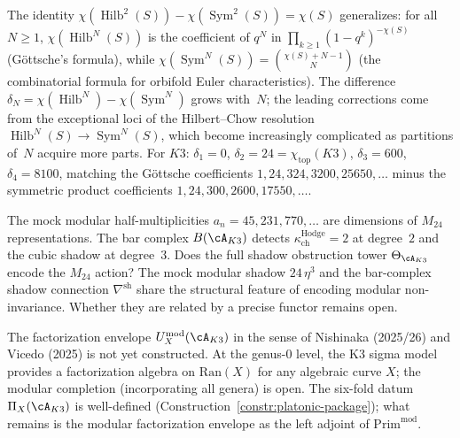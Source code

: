 \begin{remark}
\label{rem:hilbert-chow-higher}
The identity
$\chi(\operatorname{Hilb}^2(S)) - \chi(\operatorname{Sym}^2(S))
= \chi(S)$ generalizes: for all $N \geq 1$,
$\chi(\operatorname{Hilb}^N(S))$ is the coefficient of $q^N$ in
$\prod_{k \geq 1}(1-q^k)^{-\chi(S)}$ (G\"ottsche's formula),
while $\chi(\operatorname{Sym}^N(S))
= \binom{\chi(S) + N - 1}{N}$ (the combinatorial formula for
orbifold Euler characteristics). The difference
$\delta_N = \chi(\operatorname{Hilb}^N) -
\chi(\operatorname{Sym}^N)$ grows with~$N$; the leading
corrections come from the exceptional loci of the Hilbert--Chow
resolution $\operatorname{Hilb}^N(S) \to \operatorname{Sym}^N(S)$,
which become increasingly complicated as partitions of~$N$ acquire
more parts. For $K3$: $\delta_1 = 0$, $\delta_2 = 24 = \chi_{\mathrm{top}}(K3)$,
$\delta_3 = 600$, $\delta_4 = 8100$, matching the G\"ottsche
coefficients $1, 24, 324, 3200, 25650, \ldots$ minus the
symmetric product coefficients
$1, 24, 300, 2600, 17550, \ldots$.
\end{remark}

\begin{openproblem}
\label{op:bar-m24}
The mock modular half-multiplicities $a_n = 45, 231, 770,\ldots$
are dimensions of $M_{24}$ representations. The bar complex
$B(\cA_{K3})$ detects $\kappa_{\mathrm{ch}}^{\mathrm{Hodge}} = 2$ at degree~$2$ and the cubic
shadow at degree~$3$. Does the full shadow obstruction tower
$\Theta_{\cA_{K3}}$ encode the $M_{24}$ action? The mock modular
shadow $24\,\eta^3$ and the bar-complex shadow connection
$\nabla^{\mathrm{sh}}$ share the structural feature of encoding
modular non-invariance. Whether they are related by a precise
functor remains open.
\end{openproblem}

\begin{openproblem}
\label{op:fact-envelope-k3}
The factorization envelope $U^{\mathrm{mod}}_X(\cA_{K3})$ in the
sense of Nishinaka (2025/26) and Vicedo (2025) is not yet
constructed. At the genus-$0$ level, the K3 sigma model provides a
factorization algebra on $\mathrm{Ran}(X)$ for any algebraic curve
$X$; the modular completion (incorporating all genera) is open.
The six-fold datum
$\Pi_X(\cA_{K3})$ is well-defined
(Construction~\ref{constr:platonic-package}); what remains is the
modular factorization envelope as the left adjoint of $\mathrm{Prim}^{\mathrm{mod}}$.
\end{openproblem}

